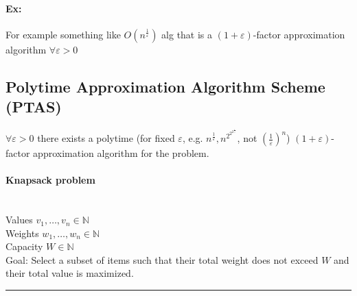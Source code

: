 \documentclass[12 pt]{article}
\begin{document}
          \paragraph{Ex:} For example something like
          $O(n^{\frac{1}{\varepsilon}})$ alg that is a
          $(1+\varepsilon)$-factor approximation algorithm $\forall
          \varepsilon > 0$
          \subsection{Polytime Approximation Algorithm Scheme (PTAS)}
          $\forall \varepsilon > 0$ there exists a polytime (for fixed
          $\varepsilon$, e.g.
          $n^{\frac{1}{\varepsilon}},
          n^{2^{2^{2^{\frac{1}{\varepsilon}}}}}$, not
          $\left(\frac{1}{\varepsilon}\right)^n$)
          $(1+\varepsilon)$-factor approximation algorithm for the
          problem.
          \paragraph{Knapsack problem}~
          \\ Values $v_1, \ldots, v_n \in \mathbb{N}$
          \\ Weights $w_1, \ldots, w_n \in \mathbb{N}$
          \\ Capacity $W \in \mathbb{N}$
          \\ Goal: Select a subset of items such that their total
          weight does not exceed $W$ and their total value is maximized.
          \\ \noindent \rule{\textwidth}{0.5pt}
\end{document}
